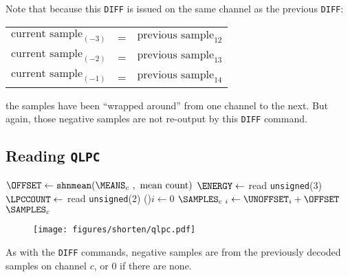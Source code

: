 \par
\noindent
Note that because this \texttt{DIFF} is issued on the same channel
as the previous \texttt{DIFF}:
\begin{table}[h]
\begin{tabular}{rcl}
  $\text{current sample}_{(-3)}$ & = & $\text{previous sample}_{12}$ \\
  $\text{current sample}_{(-2)}$ & = & $\text{previous sample}_{13}$ \\
  $\text{current sample}_{(-1)}$ & = & $\text{previous sample}_{14}$ \\
\end{tabular}
\end{table}
\par
\noindent
the samples have been ``wrapped around'' from one channel to the next.
But again, those negative samples are not re-output by
this \texttt{DIFF} command.

\clearpage

\subsection{Reading \texttt{QLPC}}
\label{shorten:read_qlpc}
{
$\text{\OFFSET} \leftarrow \texttt{shnmean}(\text{\MEANS}_c~,~\text{mean count})$\;
$\ENERGY \leftarrow$ read \texttt{unsigned}(3)\;
$\LPCCOUNT \leftarrow$ read \texttt{unsigned}(2)\;
\For(){$i \leftarrow 0$ \emph{\KwTo}\BLOCKLENGTH}{
  $\text{\SAMPLES}_{c~i} \leftarrow \text{\UNOFFSET}_i + \OFFSET$
}
\Return $\text{\SAMPLES}_c$\;
\EALGORITHM
}
\begin{figure}[h]
\texttt{[image: figures/shorten/qlpc.pdf]}
\end{figure}
\par
\noindent
As with the \texttt{DIFF} commands, negative samples are from the
previously decoded samples on channel $c$, or 0 if there are none.

